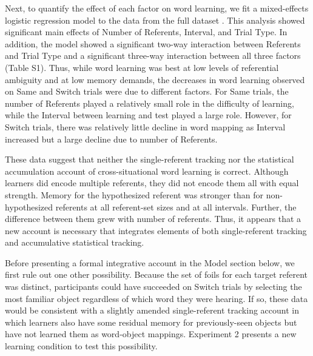 \documentclass{pnastwo}
\begin{document}
\begin{article}
Next, to quantify the effect of each factor on word learning, we fit a mixed-effects logistic regression model to the data from the full dataset \citep{Baayen2008}. This analysis showed significant main effects of Number of Referents, Interval, and Trial Type. In addition, the model showed a significant two-way interaction between Referents and Trial Type and a significant three-way interaction between all three factors (Table S1). Thus, while word learning was best at low levels of referential ambiguity and at low memory demands, the decreases in word learning observed on Same and Switch trials were due to different factors. For Same trials, the number of Referents played a relatively small role in the difficulty of learning, while the Interval between learning and test played a large role. However, for Switch trials, there was relatively little decline in word mapping as Interval increased but a large decline due to number of Referents. 

These data suggest that neither the single-referent tracking nor the statistical accumulation account of cross-situational word learning is correct. Although learners did encode multiple referents, they did not encode them all with equal strength. Memory for the hypothesized referent was stronger than for non-hypothesized referents at all referent-set sizes and at all intervals. Further, the difference between them grew with number of referents. Thus, it appears that a new account is necessary that integrates elements of both single-referent tracking and accumulative statistical tracking.

Before presenting a formal integrative account in the Model section below, we first rule out one other possibility. Because the set of foils for each target referent was distinct, participants could have succeeded on Switch trials by selecting the most familiar object regardless of which word they were hearing. If so, these data would be consistent with a slightly amended single-referent tracking account in which learners also have some residual memory for previously-seen objects but have not learned them as word-object mappings. Experiment 2 presents a new learning condition to test this possibility.



\end{article}
\end{document}
